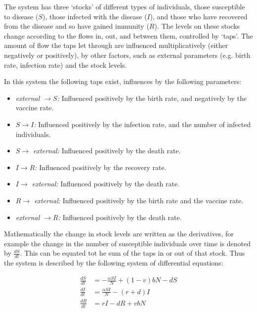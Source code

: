 
The system has three `stocks' of different types of individuals, those
susceptible to disease ($S$), those infected with the disease ($I$), and those
who have recovered from the disease and so have gained immunity ($R$). The
levels on these stocks change according to the flows in, out, and between them,
controlled by `taps'. The amount of flow the taps let through are influenced
multiplicatively (either negatively or positively), by other factors, such as
external parameters (e.g. birth rate, infection rate) and the stock levels.

In this system the following taps exist, influences by the following parameters:

\begin{itemize}
  \item \textit{external $\rightarrow S$:} Influenced positively by the birth
  rate, and negatively by the vaccine rate.
  \item \textit{$S \rightarrow I$:} Influenced positively by the infection rate,
  and the number of infected individuals.
  \item \textit{$S \rightarrow$ external:} Influenced positively by the death
  rate.
  \item \textit{$I \rightarrow R$:} Influenced positively by the recovery rate.
  \item \textit{$I \rightarrow$ external:} Influenced positively by the death
  rate.
  \item \textit{$R \rightarrow$ external:} Influenced positively by the birth
  rate and the vaccine rate.
  \item \textit{external $\rightarrow R$:} Influenced positively by the death
  rate.
\end{itemize}

Mathematically the change in stock levels are written as the derivatives, for
example the change in the number of susceptible individuals over time is denoted
by $\frac{dS}{dt}$. This can be equated tot he sum of the taps in or out of that
stock. Thus the system is described by the following system of differential
equations:

\begin{align}
\frac{dS}{dt} &= -\frac{\alpha SI}{N} + (1 - v)bN - dS\\
\frac{dI}{dt} &= \frac{\alpha SI}{N} - (r + d)I\\
\frac{dR}{dt} &= rI - dR + vbN
\end{align}

